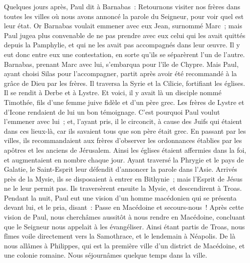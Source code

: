 \begin{multicols}{2}
Quelques jours après, Paul dit à Barnabas~: Retournons visiter nos frères dans toutes les villes où nous avons annoncé la parole du Seigneur, pour voir quel est leur état.
Or Barnabas voulait emmener avec eux Jean, surnommé Marc~;
mais Paul jugea plus convenable de ne pas prendre avec eux celui qui les avait quittés depuis la Pamphylie, et qui ne les avait pas accompagnés dans leur œuvre.
Il y eut donc entre eux une contestation, en sorte qu'ils se séparèrent l'un de l'autre. Barnabas, prenant Marc avec lui, s'embarqua pour l'île de Chypre.
Mais Paul, ayant choisi Silas pour l'accompagner, partit après avoir été recommandé à la grâce de Dieu par les frères.
Il traversa la Syrie et la Cilicie, fortifiant les églises.
\VerseOne{}Il se rendit à Derbe et à Lystre. Et voici, il y avait là un disciple nommé Timothée, fils d'une femme juive fidèle et d'un père grec.
Les frères de Lystre et d'Icone rendaient de lui un bon témoignage.
C'est pourquoi Paul voulut l'emmener avec lui~; et, l'ayant pris, il le circoncit, à cause des Juifs qui étaient dans ces lieux-là, car ils savaient tous que son père était grec.
En passant par les villes, ils recommandaient aux frères d'observer les ordonnances établies par les apôtres et les anciens de Jérusalem.
Ainsi les églises étaient affermies dans la foi, et augmentaient en nombre chaque jour.
Ayant traversé la Phrygie et le pays de Galatie, le Saint-Esprit leur défendit d'annoncer la parole dans l'Asie.
Arrivés près de la Mysie, ils se disposaient à entrer en Bithynie~; mais l'Esprit de Jésus ne le leur permit pas.
Ils traversèrent ensuite la Mysie, et descendirent à Troas.
Pendant la nuit, Paul eut une vision d'un homme macédonien qui se présenta devant lui, et le pria, disant~: Passe en Macédoine et secours-nous~!
Après cette vision de Paul, nous cherchâmes aussitôt à nous rendre en Macédoine, concluant que le Seigneur nous appelait à les évangéliser.
Ainsi étant partis de Troas, nous fîmes voile directement vers la Samothrace, et le lendemain à Néapolis.
De là nous allâmes à Philippes, qui est la première ville d'un district de Macédoine, et une colonie romaine. Nous séjournâmes quelque temps dans la ville.

\end{multicols}
